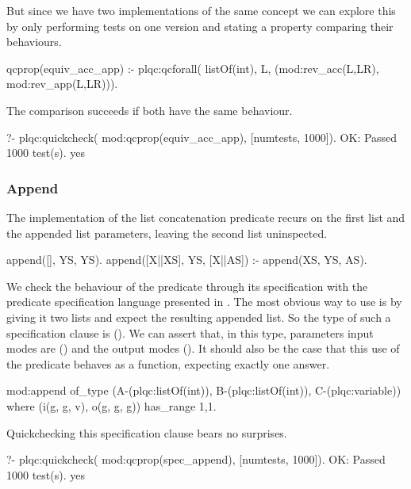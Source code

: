 But since we have two implementations of the same concept we can explore
this by only performing tests on one version and stating a property
comparing their behaviours.
%
\begin{yapcode}
 qcprop(equiv_acc_app) :-
   plqc:qcforall( listOf(int), L,
     (mod:rev_acc(L,LR), mod:rev_app(L,LR))).
\end{yapcode}
The comparison succeeds if both have the same behaviour.
%
\begin{yapcode}
   ?- plqc:quickcheck(
        mod:qcprop(equiv_acc_app),
        [{numtests, 1000}]).
 OK: Passed 1000 test(s).
 yes
\end{yapcode}



\subsubsection{Append}
The \Prolog{} implementation of the list concatenation predicate recurs on the first list
and the appended list parameters, leaving the second list uninspected.
%
\begin{yapcode}
 append([], YS, YS).
 append([X||XS], YS, [X||AS]) :-
   append(XS, YS, AS).
\end{yapcode}
%
We check the behaviour of the  predicate
through its specification with the predicate specification language
presented in .
%
The most obvious way to use  is by giving it two lists and expect
the resulting appended list.
%
So the type of such a specification clause is
().
%
We can assert that, in this \plqc{} type, parameters input modes are
() and the output modes ().
%
It should also be the case that this use of the predicate behaves as a
function, expecting exactly one answer.
%
\begin{yapcode}
 mod:append
   of_type (A-(plqc:listOf(int)),
     B-(plqc:listOf(int)), C-(plqc:variable))
   where (i(g, g, v), o(g, g, g))
   has_range {1,1}.
\end{yapcode}
%
Quickchecking this specification clause bears no surprises.
%
\begin{yapcode}
   ?- plqc:quickcheck(
        mod:qcprop(spec_append),
        [{numtests, 1000}]).
 OK: Passed 1000 test(s).
 yes
\end{yapcode}


